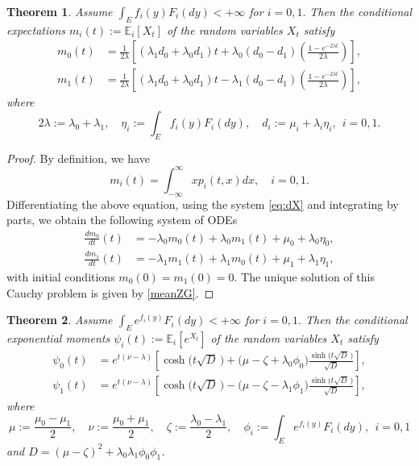 \documentclass[11pt]{article}
\theoremstyle{plain}
\newtheorem{theorem}{Theorem}[section]
\theoremstyle{definition}
\numberwithin{equation}{section}
\newcommand{\Exp}{\mathds{E}}
\begin{document}
\begin{theorem}\label{thm:meanZG}
Assume $\int_{E} f_i(y)F_i(dy)<+\infty$ for $i=0,1.$ Then the conditional expectations $m_i(t):=\Exp_i[X_t]$ of the random variables $X_t$ satisfy
\begin{equation}\label{meanZG}
\begin{split}
m_0(t)&=\frac{1}{2\lambda}\left[(\lambda_1d_0+\lambda_0d_1)t+\lambda_0(d_0-d_1)\left(\frac{1-e^{-2\lambda t}}{2\lambda}\right)\right],\\
m_1(t)&=\frac{1}{2\lambda}\left[(\lambda_1d_0+\lambda_0d_1)t-\lambda_1(d_0-d_1)\left(\frac{1-e^{-2\lambda t}}{2\lambda}\right)\right],
\end{split}
\end{equation}
where
\begin{equation*}
2\lambda:=\lambda_0+\lambda_1,\quad \eta_i:=\int_{E} f_i(y)F_i(dy),\quad d_i:=\mu_i+\lambda_i\eta_i, \ \ i=0,1.
\end{equation*}
\end{theorem}
\begin{proof}
By definition, we have
\begin{equation*}
m_i(t)=\int_{-\infty}^\infty xp_i(t,x)d x,\quad i=0,1.
\end{equation*}
Differentiating the above equation, using the system \eqref{eq:dX} and integrating by parts, we obtain the following system of ODEs
\begin{equation*}
\begin{split}
\frac{d m_0}{d t}(t)&=-\lambda_0m_0(t)+\lambda_0m_1(t)+\mu_0+\lambda_0\eta_0,\\
\frac{d m_{1}}{d t}(t)&=-\lambda_1m_1(t)+\lambda_1m_0(t)+\mu_1+\lambda_1\eta_1,
\end{split}
\end{equation*}
with initial conditions $m_0(0)=m_1(0)=0$. The unique solution of this Cauchy problem is given by \eqref{meanZG}.
\end{proof}
\begin{theorem}\label{thm:expZG}
Assume $\int_{E} e^{f_i(y)}F_i(dy)<+\infty$ for $i=0,1.$ Then the conditional exponential moments $\psi_i(t):=\Exp_i[e^{X_t}]$ of the random variables $X_t$ satisfy
\begin{equation}\label{expZG}
\begin{split}
\psi_0(t)&=e^{t(\nu-\lambda)}\left[\cosh\bigl(t\sqrt{D}\,\bigr)
+\bigl(\mu-\zeta+\lambda_0\phi_0\bigr)\frac{\sinh\bigl(t\sqrt{D}\,\bigr)}{\sqrt{D}}\right],\\
\psi_1(t)&=e^{t(\nu-\lambda)}\left[\cosh\bigl(t\sqrt{D}\,\bigr)
-\bigl(\mu-\zeta-\lambda_1\phi_1\bigr)\frac{\sinh\bigl(t\sqrt{D}\,\bigr)}{\sqrt{D}}\right],
\end{split}
\end{equation}
where
\begin{equation*}
\mu:=\frac{\mu_0-\mu_1}{2},\quad \nu:=\frac{\mu_0+\mu_1}{2}, \quad \zeta:=\frac{\lambda_0-\lambda_1}{2},\quad
\phi_i:=\int_{E} e^{f_i(y)}F_i(dy), \ \ i=0,1
\end{equation*}
and $D=(\mu-\zeta)^2+\lambda_0\lambda_1\phi_0\phi_1$.
\end{theorem}
\end{document}
